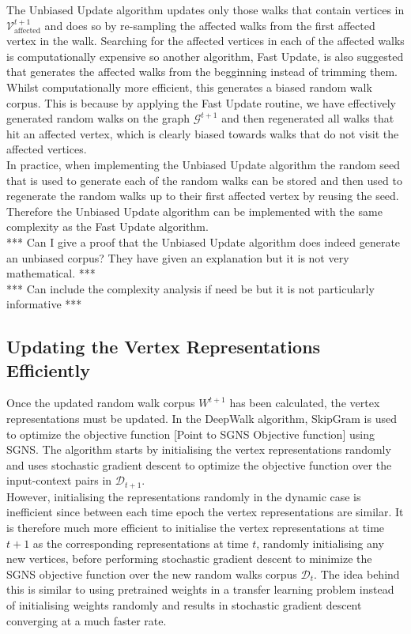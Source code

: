 \documentclass[a4paper]{article}
\newcommand{\D}{\mathcal D}
\renewcommand{\G}{\mathcal G}
\renewcommand{\V}{\mathcal V}
\begin{document}
The Unbiased Update algorithm updates only those walks that contain vertices in
$\V^{t+1}_{\text{affected}}$ and does so by re-sampling the affected walks from
the first affected vertex in the walk. Searching for the affected vertices in
each of the affected walks is computationally expensive so another algorithm,
Fast Update, is also suggested that generates the affected walks from the
begginning instead of trimming them. Whilst computationally more efficient, this
generates a biased random walk corpus. This is because by applying the Fast Update routine, we have
effectively generated random walks on the graph $\G^{t+1}$ and then regenerated
all walks that hit an affected vertex, which is clearly biased towards walks
that do not visit the affected vertices.\\

In practice, when implementing the Unbiased Update algorithm the random seed
that is used to generate each of the random walks can be stored and then used to
regenerate the random walks up to their first affected vertex by reusing the
seed. Therefore the Unbiased Update algorithm can be implemented with the same
complexity as the Fast Update algorithm.\\


*** Can I give a proof that the Unbiased Update algorithm does indeed generate
an unbiased corpus? They have given an explanation but it is not very
mathematical. ***\\


*** Can include the complexity analysis if need be but it is not particularly
informative ***

\subsection{Updating the Vertex Representations Efficiently}

Once the updated random walk corpus $W^{t+1}$ has been calculated, the vertex
representations must be updated. In the DeepWalk algorithm, SkipGram is used to
optimize the objective function [Point to SGNS Objective function] using SGNS.
The algorithm starts by initialising the vertex representations randomly and
uses stochastic gradient descent to optimize the objective function over the
input-context pairs in $\D_{t+1}$.\\

However, initialising the representations randomly in the dynamic case is
inefficient since between each time epoch the vertex representations are
similar. It is therefore much more efficient to initialise the vertex
representations at time $t+1$ as the corresponding representations at time $t$,
randomly initialising any new vertices, before performing stochastic gradient
descent to minimize the SGNS objective function over the new random walks corpus
$\D_t$. The idea behind this is similar to using pretrained weights in a transfer
learning problem instead of initialising weights randomly and results in
stochastic gradient descent converging at a much faster rate.
\end{document}
